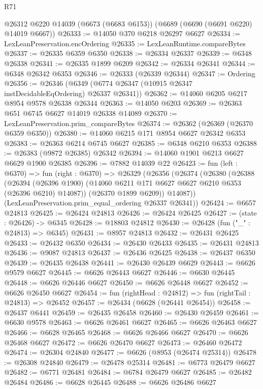 \begin{lexlean}{R71}
\begin{coremodule}
    @26312
    @6220
    @14039
    (@6673 (@6683 @6153))
    (@6689 (@6690 (@6691 @6220) @14019 @6667))
@26333 := @14050 @370 @6218 @26297 @6627
@26334 := LexLeanPreservation.encOrdering
@26335 := LexLeanRuntime.compareBytes
@26337 := @26335 @6359 @6350
@26338 := @26334 @26337
@26339 := @6348 @26338
@26341 := @26335 @1899 @6209
@26342 := @26334 @26341
@26344 := @6348 @26342 @6353
@26346 := @26333 (@26339 @26344)
@26347 := Ordering
@26356 := @26346 (@6349 (@6774 @26347 (@10915 @26347 instDecidableEqOrdering) @26337 @26341))
@26362 := @14060 @6205 @6217 @8954 @9578 @26338 @26344
@26363 := @14050 @6203
@26369 := @26363 @651 @6745 @6627 @14019 @26338 @14089
@26370 := LexLeanPreservation.prim_compareBytes
@26374 := @26362 (@26369 (@26370 @6359 @6350))
@26380 := @14060 @6215 @171 @8954 @6627 @26342 @6353
@26383 := @26363 @6214 @6745 @6627
@26385 := @6348 @6210 @6353
@26388 := @26383 (@9872 @26385) @26342
@26394 := @14060 @1901 @6213 @6627 @6629 @1900 @26385
@26396 := @7882 @14039 @22
@26423 := fun (left : @6370) =>
  fun (right : @6370) =>
  @26329
    (@26356
      (@26374
        (@26380
          (@26388
            (@26394
              (@26396 @1900)
              (@14060 @6211 @171 @6627 @6627 @6210 @6353 (@26396 @6210) @14087))
            (@26370 @1899 @6209))
          @14087))
      (LexLeanPreservation.prim_equal_ordering @26337 @26341))
@26424 := @6657 @24813
@26425 := @26424 @24813
@26426 := @26424 @26425
@26427 := (state : @26426) -> @6345
@26428 := @18803 @24812
@26430 := @26428 (fun ("_" : @24813) => @6345)
@26431 := @8957 @24813
@26432 := @26431 @26425
@26433 := @26432 @6350
@26434 := @26430 @26433
@26435 := @26431 @24813
@26436 := @9087 @24813
@26437 := @26436 @26425
@26438 := @26437 @6350
@26439 := @26435 @26438
@26441 := @26430 @26439 @6629
@26443 := @6626 @9579 @6627
@26445 := @6626 @26443 @6627
@26446 := @6630 @26445
@26448 := @6626 @26446 @6627
@26450 := @6626 @26448 @6627
@26452 := @6626 @26450 @6627
@26454 := fun (rightHead : @24812) => fun (rightTail : @24813) => @26452
@26457 := @26434 (@6628 (@26441 @26454))
@26458 := @26437 @6441
@26459 := @26435 @26458
@26460 := @26430 @26459
@26461 := @6630 @9578
@26463 := @6626 @26461 @6627
@26465 := @6626 @26463 @6627
@26466 := @6628 @26465
@26468 := @6626 @26466 @6627
@26470 := @6626 @26468 @6627
@26472 := @6626 @26470 @6627
@26473 := @26460 @26472
@26474 := @26304 @24840
@26477 := @6626 (@8953 (@26474 @25314))
@26478 := @26308 @24840
@26479 := @26478 @25314
@26481 := @6773 @26479 @6627
@26482 := @6771 @26481
@26484 := @6784 @26479 @6627
@26485 := @26482 @26484
@26486 := @6628 @26445
@26488 := @6626 @26486 @6627

\end{coremodule}
\end{lexlean}
